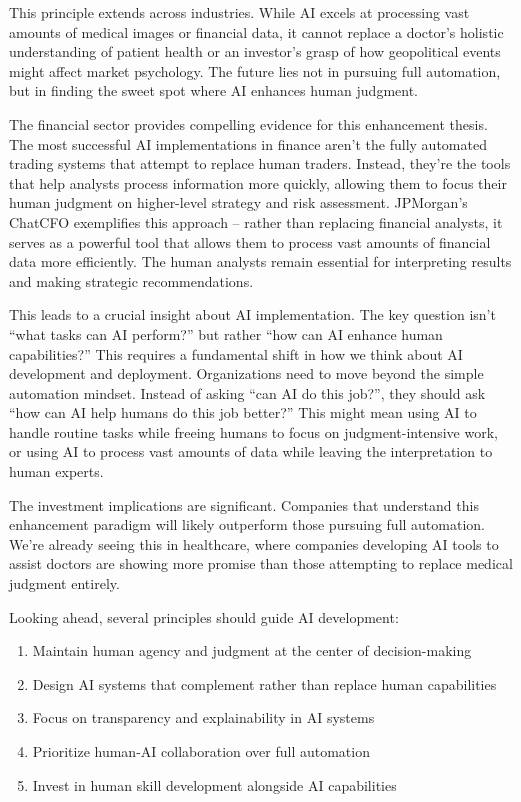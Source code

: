 \documentclass[
  Letterpaper,
]{scrbook}
\providecommand{\tightlist}{%
  \setlength{\itemsep}{0pt}\setlength{\parskip}{0pt}}\usepackage{longtable,booktabs,array}
\begin{document}
This principle extends across industries. While AI excels at processing
vast amounts of medical images or financial data, it cannot replace a
doctor's holistic understanding of patient health or an investor's grasp
of how geopolitical events might affect market psychology. The future
lies not in pursuing full automation, but in finding the sweet spot
where AI enhances human judgment.

The financial sector provides compelling evidence for this enhancement
thesis. The most successful AI implementations in finance aren't the
fully automated trading systems that attempt to replace human traders.
Instead, they're the tools that help analysts process information more
quickly, allowing them to focus their human judgment on higher-level
strategy and risk assessment. JPMorgan's ChatCFO exemplifies this
approach -- rather than replacing financial analysts, it serves as a
powerful tool that allows them to process vast amounts of financial data
more efficiently. The human analysts remain essential for interpreting
results and making strategic recommendations.

This leads to a crucial insight about AI implementation. The key
question isn't ``what tasks can AI perform?'' but rather ``how can AI
enhance human capabilities?'' This requires a fundamental shift in how
we think about AI development and deployment. Organizations need to move
beyond the simple automation mindset. Instead of asking ``can AI do this
job?'', they should ask ``how can AI help humans do this job better?''
This might mean using AI to handle routine tasks while freeing humans to
focus on judgment-intensive work, or using AI to process vast amounts of
data while leaving the interpretation to human experts.

The investment implications are significant. Companies that understand
this enhancement paradigm will likely outperform those pursuing full
automation. We're already seeing this in healthcare, where companies
developing AI tools to assist doctors are showing more promise than
those attempting to replace medical judgment entirely.

Looking ahead, several principles should guide AI development:

\begin{enumerate}
\def\labelenumi{\arabic{enumi}.}
\tightlist
\item
  Maintain human agency and judgment at the center of decision-making
\item
  Design AI systems that complement rather than replace human
  capabilities
\item
  Focus on transparency and explainability in AI systems
\item
  Prioritize human-AI collaboration over full automation
\item
  Invest in human skill development alongside AI capabilities
\end{enumerate}
\end{document}
